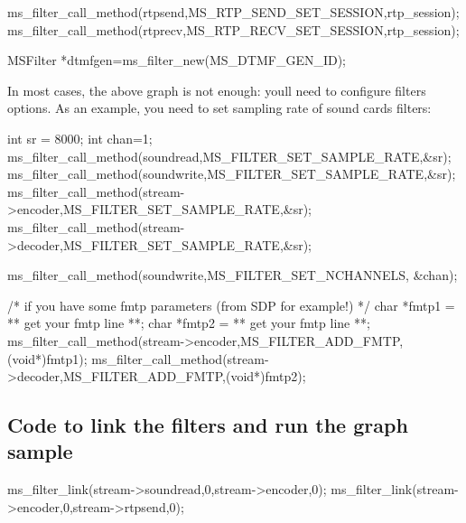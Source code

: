 \begin{DoxyPre}        ms\_filter\_call\_method(rtpsend,MS\_RTP\_SEND\_SET\_SESSION,rtp\_session);
        ms\_filter\_call\_method(rtprecv,MS\_RTP\_RECV\_SET\_SESSION,rtp\_session);\end{DoxyPre}



\begin{DoxyPre}        MSFilter *dtmfgen=ms\_filter\_new(MS\_DTMF\_GEN\_ID);
\end{DoxyPre}


In most cases, the above graph is not enough\+: you\textquotesingle{}ll need to configure filter\textquotesingle{}s options. As an example, you need to set sampling rate of sound cards\textquotesingle{} filters\+:


\begin{DoxyPre}
        int sr = 8000;
        int chan=1;
        ms\_filter\_call\_method(soundread,MS\_FILTER\_SET\_SAMPLE\_RATE,&sr);
        ms\_filter\_call\_method(soundwrite,MS\_FILTER\_SET\_SAMPLE\_RATE,&sr);
        ms\_filter\_call\_method(stream->encoder,MS\_FILTER\_SET\_SAMPLE\_RATE,\&sr);
        ms\_filter\_call\_method(stream->decoder,MS\_FILTER\_SET\_SAMPLE\_RATE,\&sr);\end{DoxyPre}



\begin{DoxyPre}        ms\_filter\_call\_method(soundwrite,MS\_FILTER\_SET\_NCHANNELS, &chan);\end{DoxyPre}



\begin{DoxyPre}        /* if you have some fmtp parameters (from SDP for example!) */
        char *fmtp1 = ** get your fmtp line **;
        char *fmtp2 = ** get your fmtp line **;
        ms\_filter\_call\_method(stream->encoder,MS\_FILTER\_ADD\_FMTP, (void*)fmtp1);
        ms\_filter\_call\_method(stream->decoder,MS\_FILTER\_ADD\_FMTP,(void*)fmtp2);
\end{DoxyPre}


\subsection*{Code to link the filters and run the graph sample}


\begin{DoxyPre}
        ms\_filter\_link(stream->soundread,0,stream->encoder,0);
        ms\_filter\_link(stream->encoder,0,stream->rtpsend,0);\end{DoxyPre}



